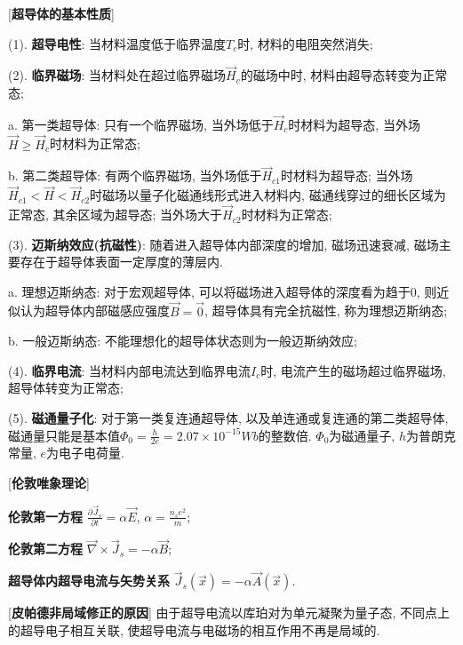 [\textbf{超导体的基本性质}]\par
\qquad (1). \textbf{超导电性}: 当材料温度低于临界温度$T_c$时, 材料的电阻突然消失;\par
\qquad (2). \textbf{临界磁场}: 当材料处在超过临界磁场$\vec H_c$的磁场中时, 材料由超导态转变为正常态;\par
\qquad \qquad a. 第一类超导体: 只有一个临界磁场, 当外场低于$\vec H_c$时材料为超导态, 当外场$\vec H\ge \vec H_c$时材料为正常态;\par
\qquad \qquad b. 第二类超导体: 有两个临界磁场, 当外场低于$\vec H_{c1}$时材料为超导态; 当外场$\vec H_{c1}<\vec H<\vec H_{c2}$时磁场以量子化磁通线形式进入材料内, 磁通线穿过的细长区域为正常态, 其余区域为超导态; 当外场大于$\vec H_{c2}$时材料为正常态;\par
\qquad (3). \textbf{迈斯纳效应(抗磁性)}: 随着进入超导体内部深度的增加, 磁场迅速衰减, 磁场主要存在于超导体表面一定厚度的薄层内.\par
\qquad \qquad a. 理想迈斯纳态: 对于宏观超导体, 可以将磁场进入超导体的深度看为趋于$0$, 则近似认为超导体内部磁感应强度$\vec B=\vec 0$, 超导体具有完全抗磁性, 称为理想迈斯纳态;\par
\qquad \qquad b. 一般迈斯纳态: 不能理想化的超导体状态则为一般迈斯纳效应;\par
\qquad (4). \textbf{临界电流}: 当材料内部电流达到临界电流$I_c$时, 电流产生的磁场超过临界磁场, 超导体转变为正常态;\par
\qquad (5). \textbf{磁通量子化}: 对于第一类复连通超导体, 以及单连通或复连通的第二类超导体, 磁通量只能是基本值$\Phi_0=\frac{h}{2e}=2.07\times 10^{-15}Wb$的整数倍. $\Phi_0$为磁通量子, $h$为普朗克常量, $e$为电子电荷量.\par

[\textbf{伦敦唯象理论}]\par
\qquad \textbf{伦敦第一方程} $\frac{\partial\vec J_s}{\partial t}=\alpha \vec E$, $\alpha=\frac{n_se^2}{m}$;\par
\qquad \textbf{伦敦第二方程} $\vec\nabla\times\vec J_s=-\alpha\vec B$;\par
\qquad \textbf{超导体内超导电流与矢势关系} $\vec J_s(\vec x)=-\alpha\vec A(\vec x)$.\par

[\textbf{皮帕德非局域修正的原因}] 由于超导电流以库珀对为单元凝聚为量子态, 不同点上的超导电子相互关联, 使超导电流与电磁场的相互作用不再是局域的.


